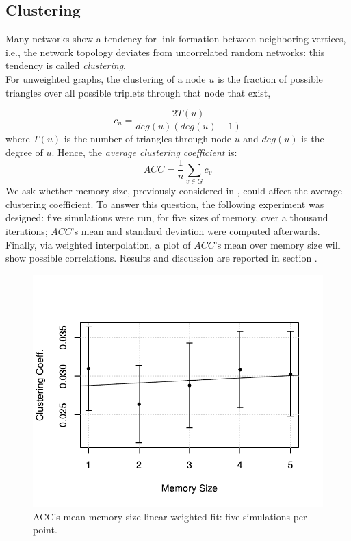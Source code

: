\subsection{Clustering} \label{clustering}
Many networks show a tendency for link formation
between neighboring vertices, i.e., the network topology deviates
from uncorrelated random networks: this tendency is called
\textit{clustering}.\cite{clusterarticle}\\
For unweighted graphs, the clustering of a node $u$ is the fraction
of possible triangles over all possible triplets
through that node that exist,\cite{clustersite}

\begin{equation}
  \label{eq:clustering}
  c_u = \frac{2 T(u)}{deg(u)(deg(u)-1)}
\end{equation}
where $T(u)$ is the number of triangles through node $u$ and $deg(u)$ is the degree of $u$.
Hence, the \textit{average clustering coefficient}  is:
\begin{equation}
  \label{eq:averageclustering}
  ACC = \frac{1}{n}\sum_{v \in G} c_v
\end{equation}
We ask whether memory size, previously considered in
, could affect the average clustering coefficient.
To answer this question, the following experiment was designed:
five simulations were run, for five sizes of memory, over a thousand
iterations; $ACC$'s mean and standard deviation were computed
afterwards.\\
Finally, via weighted interpolation, a plot of $ACC$'s mean
over memory size will show possible  correlations.
Results and discussion are reported in section .
\begin{figure}[h]
  \centering
  \includegraphics[trim={0cm 0cm 0cm 1cm},clip,width=.8\columnwidth]{img/clustering.pdf}
  \caption{ACC's mean-memory size linear weighted fit: five simulations per point.\label{fig:clustering}}
\end{figure}
